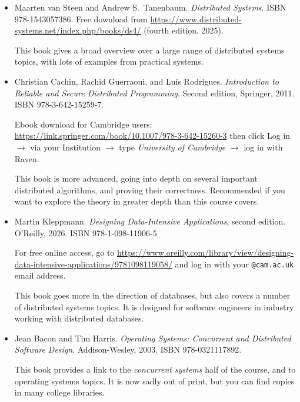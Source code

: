 \begin{itemize}
    \item Maarten van Steen and Andrew S.\ Tanenbaum. \emph{Distributed Systems}. ISBN 978-1543057386.
        Free download from \url{https://www.distributed-systems.net/index.php/books/ds4/} (fourth edition, 2025).

        This book gives a broad overview over a large range of distributed systems topics, with lots of examples from practical systems.

    \item Christian Cachin, Rachid Guerraoui, and Luís Rodrigues.
        \emph{Introduction to Reliable and Secure Distributed Programming}.
        Second edition, Springer, 2011. ISBN 978-3-642-15259-7.

        Ebook download for Cambridge users: \url{https://link.springer.com/book/10.1007/978-3-642-15260-3} then click Log in $\rightarrow$ via your Institution $\rightarrow$ type \emph{University of Cambridge} $\rightarrow$ log in with Raven.

        This book is more advanced, going into depth on several important distributed algorithms, and proving their correctness.
        Recommended if you want to explore the theory in greater depth than this course covers.

    \item Martin Kleppmann. \emph{Designing Data-Intensive Applications}, second edition. O'Reilly, 2026. ISBN 978-1-098-11906-5

        For free online access, go to \url{https://www.oreilly.com/library/view/designing-data-intensive-applications/9781098119058/} and log in with your \texttt{@cam.ac.uk} email address.

        This book goes more in the direction of databases, but also covers a number of distributed systems topics.
        It is designed for software engineers in industry working with distributed databases.

    \item Jean Bacon and Tim Harris. \emph{Operating Systems: Concurrent and Distributed Software Design}.
        Addison-Wesley, 2003. ISBN 978-0321117892.

        This book provides a link to the \emph{concurrent systems} half of the course, and to operating systems topics.
        It is now sadly out of print, but you can find copies in many college libraries.
\end{itemize}

